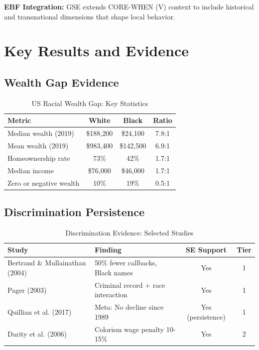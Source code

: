\textbf{EBF Integration:} GSE extends CORE-WHEN (V) context to include historical and transnational dimensions that shape local behavior.

\section{Key Results and Evidence}
\label{sec:se-results}

\subsection{Wealth Gap Evidence}

\begin{table}[htbp]
\centering
\caption{US Racial Wealth Gap: Key Statistics}
\label{tab:se-wealth-gap}
\begin{tabular}{lccc}
\toprule
\textbf{Metric} & \textbf{White} & \textbf{Black} & \textbf{Ratio} \\
\midrule
Median wealth (2019) & \$188,200 & \$24,100 & 7.8:1 \\
Mean wealth (2019) & \$983,400 & \$142,500 & 6.9:1 \\
Homeownership rate & 73\% & 42\% & 1.7:1 \\
Median income & \$76,000 & \$46,000 & 1.7:1 \\
Zero or negative wealth & 10\% & 19\% & 0.5:1 \\
\bottomrule
\end{tabular}
\end{table}

\subsection{Discrimination Persistence}

\begin{table}[htbp]
\centering
\caption{Discrimination Evidence: Selected Studies}
\label{tab:se-discrimination}
\begin{tabular}{llcc}
\toprule
\textbf{Study} & \textbf{Finding} & \textbf{SE Support} & \textbf{Tier} \\
\midrule
Bertrand \& Mullainathan (2004) & 50\% fewer callbacks, Black names & Yes & 1 \\
Pager (2003) & Criminal record + race interaction & Yes & 1 \\
Quillian et al. (2017) & Meta: No decline since 1989 & Yes (persistence) & 1 \\
Darity et al. (2006) & Colorism wage penalty 10-15\% & Yes & 2 \\
\bottomrule
\end{tabular}
\end{table}

